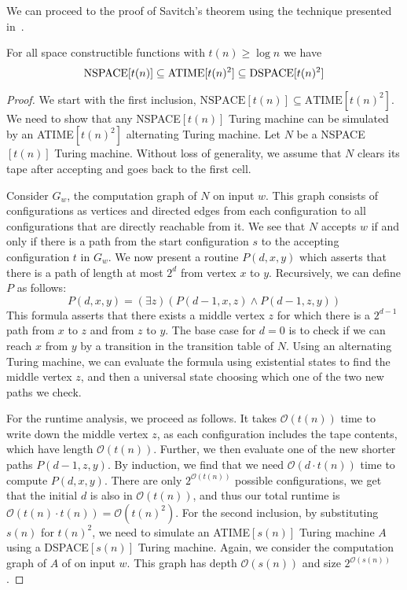 We can proceed to the proof of Savitch's theorem using the technique presented in~\cite{descriptive-complexity}.
\begin{theorem}
    For all space constructible functions with $t(n) \geq \log n$ we have
    \[
        \text{\upshape NSPACE}[t(n)] \subseteq \text{\upshape ATIME}[t(n)^2] \subseteq \text{\upshape DSPACE}[t(n)^2]
    \]
\end{theorem}

\begin{proof}
    We start with the first inclusion, $\text{NSPACE$[t(n)]$} \subseteq \text{ATIME$[t(n)^2]$}$.
    We need to show that any NSPACE$[t(n)]$ Turing machine can be simulated by an ATIME$[t(n)^2]$ alternating Turing machine.
    Let $N$ be a NSPACE$[t(n)]$ Turing machine.
    Without loss of generality, we assume that $N$ clears its tape after accepting and goes back to the first cell.

    Consider $G_w$, the computation graph of $N$ on input $w$.
    This graph consists of configurations as vertices and directed edges from each configuration to all configurations that are directly reachable from it.
    We see that $N$ accepts $w$ if and only if there is a path from the start configuration $s$ to the accepting configuration $t$ in $G_w$.
    We now present a routine $P(d, x, y)$ which asserts that there is a path of length at most $2^{d}$ from vertex $x$ to $y$.
    Recursively, we can define $P$ as follows:
    \[
        P(d, x, y) = (\exists z)(P(d - 1, x, z) \land P(d - 1, z, y))
    \]
    This formula asserts that there exists a middle vertex $z$ for which there is a $2^{d - 1}$ path from $x$ to $z$ and from $z$ to $y$.
    The base case for $d = 0$ is to check if we can reach $x$ from $y$ by a transition in the transition table of $N$.
    Using an alternating Turing machine, we can evaluate the formula using existential states to find the middle vertex $z$, and then a universal state choosing which one of the two new paths we check.

    For the runtime analysis, we proceed as follows.
    It takes $\mathcal{O}(t(n))$ time to write down the middle vertex $z$, as each configuration includes the tape contents, which have length $\mathcal{O}(t(n))$.
    Further, we then evaluate one of the new shorter paths $P(d - 1, z, y)$.
    By induction, we find that we need $\mathcal{O}(d\cdot t(n))$ time to compute $P(d, x, y)$.
    There are only $2^{\mathcal{O}(t(n))}$ possible configurations, we get that the initial $d$ is also in $\mathcal{O}(t(n))$, and thus our total runtime is $\mathcal{O}(t(n)\cdot t(n)) = \mathcal{O}(t(n)^2)$.
    \vspace{5mm}
    \sloppy For the second inclusion, by substituting $s(n)$ for $t(n)^2$, we need to simulate an ATIME$[s(n)]$ Turing machine $A$ using a DSPACE$[s(n)]$ Turing machine.
    Again, we consider the computation graph of $A$ of on input $w$.
    This graph has depth $\mathcal{O}(s(n))$ and size $2^{\mathcal{O}(s(n))}$.


\end{proof}
